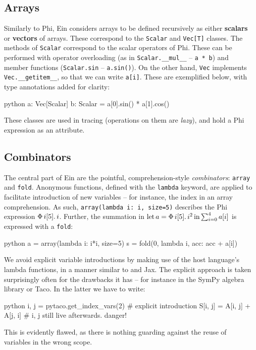\subsection{Arrays}

Similarly to Phi, Ein considers arrays to be defined recursively as either \textbf{scalars} or \textbf{vectors} of arrays. These correspond to the \texttt{Scalar} and \texttt{Vec[T]} classes. The methods of \texttt{Scalar} correspond to the scalar operators of Phi. These can be performed with operator overloading (as in \texttt{Scalar.\_\_mul\_\_} -- \texttt{a * b}) and member functions (\texttt{Scalar.sin} -- \texttt{a.sin()}). On the other hand, \texttt{Vec} implements \texttt{Vec.\_\_getitem\_\_}, so that we can write \texttt{a[i]}. These are exemplified below, with type annotations added for clarity:
\begin{center}
\begin{cminted}{python}
a: Vec[Scalar]
b: Scalar = a[0].sin() * a[1].cos()
\end{cminted}
\end{center}
These classes are used in tracing (operations on them are \textit{lazy}), and hold a Phi expression as an attribute.

\subsection{Combinators}

The central part of Ein are the pointful, comprehension-style \textit{combinators}: \texttt{array} and \texttt{fold}. Anonymous functions, defined with the \texttt{lambda} keyword, are applied to facilitate introduction of new variables -- for instance, the index in an array comprehension. As such, \texttt{array(lambda i: i, size=5)} describes the Phi expression $\Phi\, {i}[{5}] \ldotp {i}$. Further, the summation in $\mathrm{let}\,{a}={\Phi\, {i}[{5}] \ldotp {i^2}}\,\mathrm{in}\,{ \sum_{i=0}^{4} a[i]}$ is expressed with a \texttt{fold}:
\begin{center}
\begin{cminted}{python}
a = array(lambda i: i*i, size=5)
s = fold(0, lambda i, acc: acc + a[i])
\end{cminted}
\end{center}
We avoid explicit variable introductions by making use of the host language's lambda functions, in a manner similar to \textcite{atkey2009unembedding} and Jax. The explicit approach is taken surprisingly often for the drawbacks it has -- for instance in the SymPy algebra library or Taco. In the latter we have to write:
\begin{center}
\begin{cminted}{python}
i, j = pytaco.get_index_vars(2)  # explicit introduction
S[i, j] = A[i, j] + A[j, i]      # i, j still live afterwards. danger!
\end{cminted}
\end{center}
This is evidently flawed, as there is nothing guarding against the reuse of variables in the wrong scope. 


